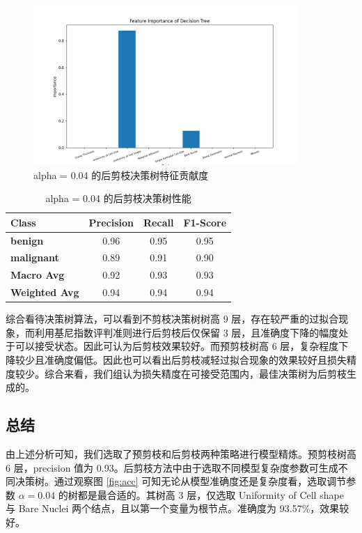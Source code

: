 \documentclass[a4paper,12pt,onecolumn,oneside]{article}
\begin{document}
	\begin{figure}[H]
		\centering
		\includegraphics[width=0.9\textwidth]{res3/best_importance.png}
		\caption{alpha = 0.04 的后剪枝决策树特征贡献度}
		\label{fig:tree_0.04_imp}
	\end{figure}
	
	\begin{table}[H]
	\centering
	\begin{tabular}{lccc}
		\toprule
		\textbf{Class} & \textbf{Precision} & \textbf{Recall} & \textbf{F1-Score} \\
		\midrule
		\textbf{benign} & 0.96 & 0.95 & 0.95 \\
		\textbf{malignant} & 0.89 & 0.91 & 0.90 \\
		\midrule
		\textbf{Macro Avg} & 0.92 & 0.93 & 0.93 \\
		\textbf{Weighted Avg} & 0.94 & 0.94 & 0.94 \\
		\bottomrule
	\end{tabular}
	\caption{alpha = 0.04 的后剪枝决策树性能}
	\label{tbl:alpha0.04}
	\end{table}
	
	综合看待决策树算法，可以看到不剪枝决策树树高 9 层，存在较严重的过拟合现象，而利用基尼指数评判准则进行后剪枝后仅保留 3 层，且准确度下降的幅度处于可以接受状态。因此可认为后剪枝效果较好。而预剪枝树高 6 层，复杂程度下降较少且准确度偏低。因此也可以看出后剪枝减轻过拟合现象的效果较好且损失精度较少。综合来看，我们组认为损失精度在可接受范围内，最佳决策树为后剪枝生成的。
	
	\subsection{总结}
	由上述分析可知，我们选取了预剪枝和后剪枝两种策略进行模型精炼。预剪枝树高 6 层，precision 值为 0.93。后剪枝方法中由于选取不同模型复杂度参数可生成不同决策树。通过观察图 \ref{fig:acc} 可知无论从模型准确度还是复杂度看，选取调节参数 $\alpha = 0.04$ 的树都是最合适的。其树高 3 层，仅选取 Uniformity of Cell shape 与 Bare Nuclei 两个结点，且以第一个变量为根节点。准确度为 93.57\%，效果较好。
	
\end{document}
